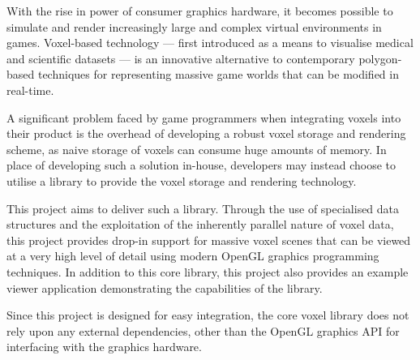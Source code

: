 With the rise in power of consumer graphics hardware, it becomes possible to
simulate and render increasingly large and complex virtual environments in games. Voxel-based technology --- first introduced as a means to visualise medical and scientific datasets --- is an innovative alternative to contemporary polygon-based techniques for representing massive game worlds that can be modified in real-time.

A significant problem faced by game programmers when integrating voxels into
their product is the overhead of developing a robust voxel storage and rendering
scheme, as naive storage of voxels can consume huge amounts of memory. In place of 
developing such a solution in-house, developers may instead choose to utilise a 
library to provide the voxel storage and rendering technology.

This project aims to deliver such a library. Through the use of specialised data 
structures and the exploitation of the inherently parallel nature of voxel data,
this project provides drop-in support for massive voxel scenes that can be viewed
at a very high level of detail using modern OpenGL graphics programming techniques. 
In addition to this core library, this project also provides an example viewer application
demonstrating the capabilities of the library.

Since this project is designed for easy integration, the core voxel library does
not rely upon any external dependencies, other than the OpenGL graphics API for
interfacing with the graphics hardware. 
